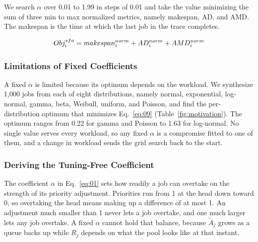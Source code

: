 \documentclass{ieeetj}
\begin{document}
We search $\alpha$ over 0.01 to 1.99 in steps of 0.01 and take the value minimizing the sum of three min to max normalized metrics, namely makespan, AD, and AMD. The makespan is the time at which the last job in the trace completes. 

\begin{equation}
Obj_i^{sfa} = makespan_i^{norm} + AD_i^{norm} + AMD_i^{norm}
\label{eq:09}
\vspace{2pt}
\end{equation}

\subsubsection{Limitations of Fixed Coefficients}\label{coeff:limit}
A fixed $\alpha$ is limited because its optimum depends on the workload. We synthesize 1,000 jobs from each of eight distributions, namely normal, exponential, log-normal, gamma, beta, Weibull, uniform, and Poisson, and find the per-distribution optimum that minimizes Eq.~\eqref{eq:09} (Table~\ref{fig:motivation}). The optimum ranges from 0.22 for gamma and Poisson to 1.63 for log-normal. No single value serves every workload, so any fixed $\alpha$ is a compromise fitted to one of them, and a change in workload sends the grid search back to the start.

\begin{table}[htb!]
\centering
\caption{Optimal $\alpha$ by distribution}
\label{fig:motivation}
\footnotesize
\setlength{\tabcolsep}{4pt}
\end{table}

\subsubsection{Deriving the Tuning-Free Coefficient} \label{alphaeff}
The coefficient $\alpha$ in Eq.~\eqref{eq:01} sets how readily a job can overtake on the strength of its priority adjustment. Priorities run from 1 at the head down toward 0, so overtaking the head means making up a difference of at most 1. An adjustment much smaller than 1 never lets a job overtake, and one much larger lets any job overtake. A fixed $\alpha$ cannot hold that balance, because $\tilde A_j$ grows as a queue backs up while $R_j$ depends on what the pool looks like at that instant.
\end{document}
